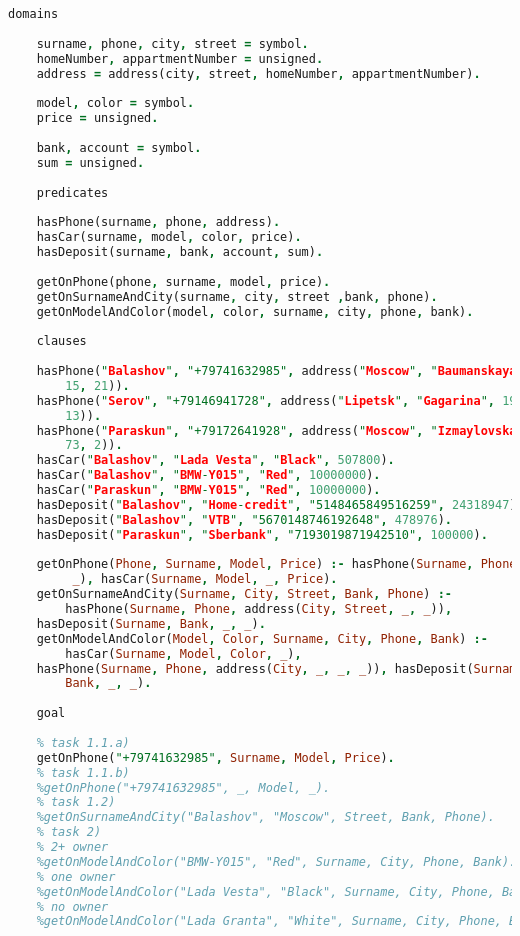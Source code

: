 \documentclass[14pt,a4paper]{scrreprt}
\begin{document}
\begin{lstlisting}[language=Prolog]
	domains
	
	surname, phone, city, street = symbol.
	homeNumber, appartmentNumber = unsigned.
	address = address(city, street, homeNumber, appartmentNumber).
	
	model, color = symbol.
	price = unsigned.
	
	bank, account = symbol.
	sum = unsigned.
	
	predicates
	
	hasPhone(surname, phone, address).
	hasCar(surname, model, color, price).
	hasDeposit(surname, bank, account, sum).
	
	getOnPhone(phone, surname, model, price).
	getOnSurnameAndCity(surname, city, street ,bank, phone).
	getOnModelAndColor(model, color, surname, city, phone, bank).
	
	clauses
	
	hasPhone("Balashov", "+79741632985", address("Moscow", "Baumanskaya",
		15, 21)).
	hasPhone("Serov", "+79146941728", address("Lipetsk", "Gagarina", 192, 
		13)).
	hasPhone("Paraskun", "+79172641928", address("Moscow", "Izmaylovskaya", 
		73, 2)).
	hasCar("Balashov", "Lada Vesta", "Black", 507800).
	hasCar("Balashov", "BMW-Y015", "Red", 10000000).
	hasCar("Paraskun", "BMW-Y015", "Red", 10000000).
	hasDeposit("Balashov", "Home-credit", "5148465849516259", 24318947).
	hasDeposit("Balashov", "VTB", "5670148746192648", 478976).
	hasDeposit("Paraskun", "Sberbank", "7193019871942510", 100000).
	
	getOnPhone(Phone, Surname, Model, Price) :- hasPhone(Surname, Phone,
		 _), hasCar(Surname, Model, _, Price).
	getOnSurnameAndCity(Surname, City, Street, Bank, Phone) :- 
		hasPhone(Surname, Phone, address(City, Street, _, _)),
	hasDeposit(Surname, Bank, _, _). 
	getOnModelAndColor(Model, Color, Surname, City, Phone, Bank) :- 
		hasCar(Surname, Model, Color, _), 
	hasPhone(Surname, Phone, address(City, _, _, _)), hasDeposit(Surname, 
		Bank, _, _).
	
	goal
	
	% task 1.1.a)
	getOnPhone("+79741632985", Surname, Model, Price).
	% task 1.1.b)
	%getOnPhone("+79741632985", _, Model, _).
	% task 1.2)
	%getOnSurnameAndCity("Balashov", "Moscow", Street, Bank, Phone).
	% task 2)
	% 2+ owner
	%getOnModelAndColor("BMW-Y015", "Red", Surname, City, Phone, Bank).
	% one owner
	%getOnModelAndColor("Lada Vesta", "Black", Surname, City, Phone, Bank).
	% no owner
	%getOnModelAndColor("Lada Granta", "White", Surname, City, Phone, Bank).
\end{lstlisting}
\end{document}
